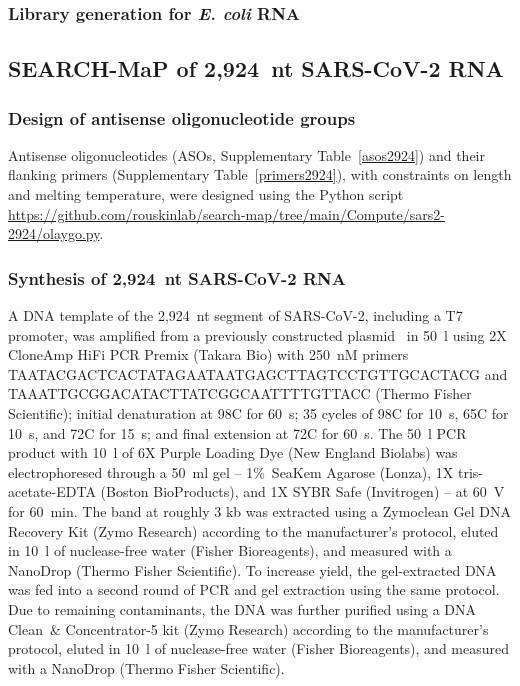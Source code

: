 \documentclass[main.tex]{subfiles}
\begin{document}
\subsubsection{Library generation for \textit{E. coli} RNA}








\subsection{SEARCH-MaP of 2,924~nt SARS-CoV-2 RNA}

\subsubsection{Design of antisense oligonucleotide groups}

Antisense oligonucleotides (ASOs, Supplementary Table~\ref{asos2924}) and their flanking primers (Supplementary Table~\ref{primers2924}), with constraints on length and melting temperature, were designed using the Python script \url{https://github.com/rouskinlab/search-map/tree/main/Compute/sars2-2924/olaygo.py}.

\subsubsection{Synthesis of 2,924~nt SARS-CoV-2 RNA}

A DNA template of the 2,924~nt segment of SARS-CoV-2, including a T7 promoter, was amplified from a previously constructed plasmid~\cite{Lan2022} in 50~\textmu l using 2X CloneAmp HiFi PCR Premix (Takara Bio) with 250~nM primers TAATACGACTCACTATAGAATAATGAGCTTAGTCCTGTTGCACTACG and TAAATTGCGGACATACTTATCGGCAATTTTGTTACC (Thermo Fisher Scientific); initial denaturation at 98\textdegree C for 60~s; 35 cycles of 98\textdegree C for 10~s, 65\textdegree C for 10~s, and 72\textdegree C for 15~s; and final extension at 72\textdegree C for 60~s.
The 50~\textmu l PCR product with 10~\textmu l of 6X Purple Loading Dye (New England Biolabs) was electrophoresed through a 50~ml gel -- 1\%~SeaKem Agarose (Lonza), 1X tris-acetate-EDTA (Boston BioProducts), and 1X SYBR Safe (Invitrogen) -- at 60~V for 60~min.
The band at roughly 3 kb was extracted using a Zymoclean Gel DNA Recovery Kit (Zymo Research) according to the manufacturer's protocol, eluted in 10~\textmu l of nuclease-free water (Fisher Bioreagents), and measured with a NanoDrop (Thermo Fisher Scientific).
To increase yield, the gel-extracted DNA was fed into a second round of PCR and gel extraction using the same protocol.
Due to remaining contaminants, the DNA was further purified using a DNA Clean~\& Concentrator-5 kit (Zymo Research) according to the manufacturer's protocol, eluted in 10~\textmu l of nuclease-free water (Fisher Bioreagents), and measured with a NanoDrop (Thermo Fisher Scientific).
\end{document}
